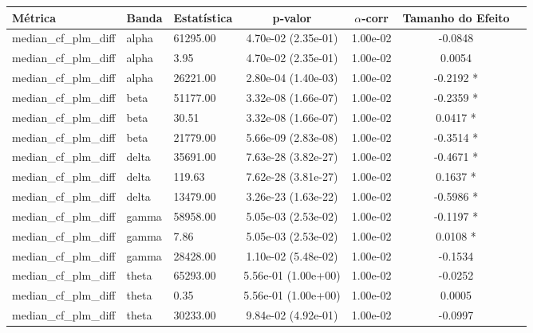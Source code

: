 \begin{table}[htbp]
  \centering
  \begin{tabular}{l l l c c c c}
    \toprule
    Métrica & Banda & Estatística & p‑valor & $\alpha$‑corr & Tamanho do Efeito \\
    \midrule
    median\_cf\_plm\_diff & alpha & 61295.00 & 4.70e-02 (2.35e-01) & 1.00e-02 & -0.0848  \\
    median\_cf\_plm\_diff & alpha & 3.95 & 4.70e-02 (2.35e-01) & 1.00e-02 & 0.0054  \\
    median\_cf\_plm\_diff & alpha & 26221.00 & 2.80e-04 (1.40e-03) & 1.00e-02 & -0.2192 * \\
    median\_cf\_plm\_diff & beta & 51177.00 & 3.32e-08 (1.66e-07) & 1.00e-02 & -0.2359 * \\
    median\_cf\_plm\_diff & beta & 30.51 & 3.32e-08 (1.66e-07) & 1.00e-02 & 0.0417 * \\
    median\_cf\_plm\_diff & beta & 21779.00 & 5.66e-09 (2.83e-08) & 1.00e-02 & -0.3514 * \\
    median\_cf\_plm\_diff & delta & 35691.00 & 7.63e-28 (3.82e-27) & 1.00e-02 & -0.4671 * \\
    median\_cf\_plm\_diff & delta & 119.63 & 7.62e-28 (3.81e-27) & 1.00e-02 & 0.1637 * \\
    median\_cf\_plm\_diff & delta & 13479.00 & 3.26e-23 (1.63e-22) & 1.00e-02 & -0.5986 * \\
    median\_cf\_plm\_diff & gamma & 58958.00 & 5.05e-03 (2.53e-02) & 1.00e-02 & -0.1197 * \\
    median\_cf\_plm\_diff & gamma & 7.86 & 5.05e-03 (2.53e-02) & 1.00e-02 & 0.0108 * \\
    median\_cf\_plm\_diff & gamma & 28428.00 & 1.10e-02 (5.48e-02) & 1.00e-02 & -0.1534  \\
    median\_cf\_plm\_diff & theta & 65293.00 & 5.56e-01 (1.00e+00) & 1.00e-02 & -0.0252  \\
    median\_cf\_plm\_diff & theta & 0.35 & 5.56e-01 (1.00e+00) & 1.00e-02 & 0.0005  \\
    median\_cf\_plm\_diff & theta & 30233.00 & 9.84e-02 (4.92e-01) & 1.00e-02 & -0.0997  \\
    \bottomrule
  \end{tabular}
\end{table}